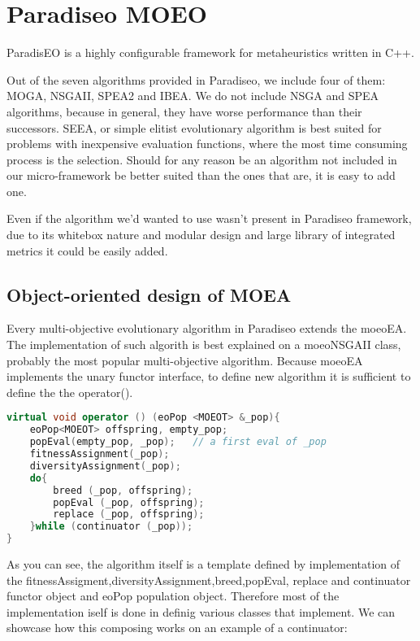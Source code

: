 \documentclass[12pt,oneside]{fithesis2}
\begin{document}
\section{Paradiseo MOEO}
ParadisEO is a highly configurable framework for metaheuristics written in C++.\cite{liefooghe2007Paradiseo} 

Out of the seven algorithms provided in Paradiseo, we include four of them: MOGA, NSGAII, SPEA2 and IBEA. We do not include NSGA and SPEA algorithms, because in general, they have worse performance than their successors. SEEA, or simple elitist evolutionary algorithm is best suited for problems with inexpensive evaluation functions, where the most time consuming process is the selection. Should for any reason be an algorithm not included in our micro-framework be better suited than the ones that are, it is easy to add one.

Even if the algorithm we'd wanted to use wasn't present in Paradiseo framework, due to its whitebox nature and modular design and large library of integrated metrics it could be easily added.

\subsection{Object-oriented design of MOEA}

Every multi-objective evolutionary algorithm in Paradiseo extends the moeoEA. 
The implementation of such algorith is best explained on a  moeoNSGAII class, probably the most popular multi-objective algorithm. 
Because moeoEA implements the unary functor interface, to define new algorithm it is sufficient to define the the operator().

\begin{lstlisting}[language=C++,label=evolution,caption=NSGAII algorithm in Paradiseo]
virtual void operator () (eoPop <MOEOT> &_pop){
    eoPop<MOEOT> offspring, empty_pop;
    popEval(empty_pop, _pop);	// a first eval of _pop
    fitnessAssignment(_pop);
    diversityAssignment(_pop);
    do{
        breed (_pop, offspring);
        popEval (_pop, offspring);
        replace (_pop, offspring);
    }while (continuator (_pop));
}
\end{lstlisting}

As you can see, the algorithm itself is a template defined by implementation of the fitnessAssigment,diversityAssignment,breed,popEval, replace and continuator functor object and eoPop population object. Therefore most of the implementation iself is done in definig various classes that implement. We can showcase how this composing works on an example of a continuator:
\end{document}
